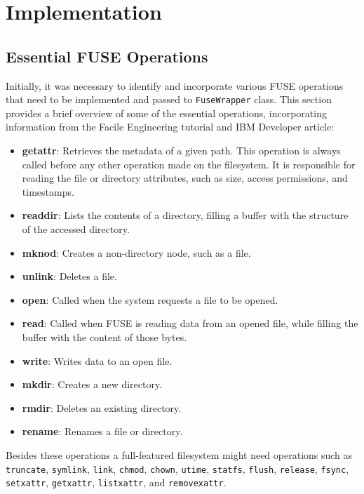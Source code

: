 \chapter{Implementation}
\label{chap:implementation}

\section{Essential FUSE Operations}\label{sec:fuse-ops}

Initially, it was necessary to identify and incorporate various FUSE operations that need to be implemented and passed to \texttt{FuseWrapper} class.
This section provides a brief overview of some of the essential operations, incorporating information from the Facile Engineering tutorial and IBM Developer article\cite{ibm_fuse, facile_fuse}:

\begin{itemize}
    \setlength\itemsep{-0.2em}
    \item \textbf{getattr}: Retrieves the metadata of a given path.
    This operation is always called before any other operation made on the filesystem.
    It is responsible for reading the file or directory attributes, such as size, access permissions, and timestamps.
    \item \textbf{readdir}: Lists the contents of a directory, filling a buffer with the structure of the accessed directory.
    \item \textbf{mknod}: Creates a non-directory node, such as a file.
    \item \textbf{unlink}: Deletes a file.
    \item \textbf{open}: Called when the system requests a file to be opened.
    \item \textbf{read}: Called when FUSE is reading data from an opened file, while filling the buffer with the content of those bytes.
    \item \textbf{write}: Writes data to an open file.
    \item \textbf{mkdir}: Creates a new directory.
    \item \textbf{rmdir}: Deletes an existing directory.
    \item \textbf{rename}: Renames a file or directory.
\end{itemize}

Besides these operations a full-featured filesystem might need operations such as \texttt{truncate}, \texttt{symlink}, \texttt{link}, \texttt{chmod}, \texttt{chown}, \texttt{utime}, \texttt{statfs}, \texttt{flush}, \texttt{release}, \texttt{fsync}, \texttt{setxattr}, \texttt{getxattr}, \texttt{listxattr}, and \texttt{removexattr}.

